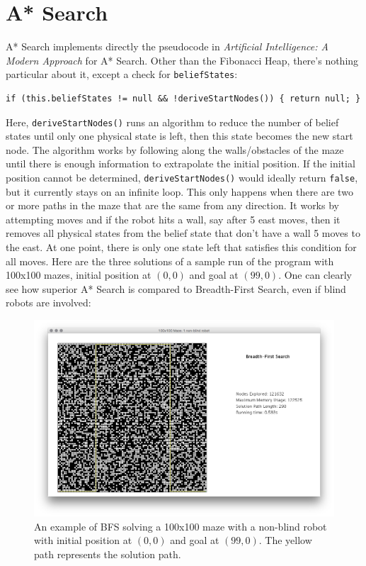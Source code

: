 \documentclass{article}
\begin{document}
\section{A* Search}
A* Search implements directly the pseudocode in  {\it Artificial Intelligence: A Modern Approach} for A* Search. Other than the Fibonacci Heap, there's nothing particular about it, except a check for \verb`beliefStates`: \\ 
\begin{lstlisting}
if (this.beliefStates != null && !deriveStartNodes()) { return null; }
\end{lstlisting}
Here, \verb`deriveStartNodes()` runs an algorithm to reduce the number of belief states until only one physical state is left, then this state becomes the new start node. The algorithm works by following along the walls/obstacles of the maze until there is enough information to extrapolate the initial position. If the initial position cannot be determined,  \verb`deriveStartNodes()` would ideally return  \verb`false`, but it currently stays on an infinite loop. This only happens when there are two or more paths in the maze that are the same from any direction. It works by attempting moves and if the robot hits a wall, say after 5 east moves, then it removes all physical states from the belief state that don't have a wall 5 moves to the east. At one point, there is only one state left that satisfies this condition for all moves. Here are the three solutions of a sample run of the program with 100x100 mazes, initial position at $(0,0)$ and goal at $(99,0)$. One can clearly see how superior A* Search is compared to Breadth-First Search, even if blind robots are involved:

\begin{figure}[!htb]
\label{fig:bfs}
\centering
\includegraphics[width=1\linewidth]{./figures/BFS-maze100x100.png}
\cprotect\caption{An example of BFS solving a 100x100 maze with a non-blind robot with initial position at $(0,0)$ and goal at $(99,0)$. The yellow path represents the solution path.}
\end{figure}
\end{document}
